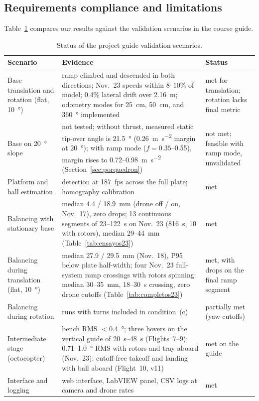\subsection{Requirements compliance and limitations}
\label{sec:requirements}
\label{sec:limits}
Table~\ref{tab:req} compares our results against the validation scenarios in the course guide.

\begin{table}[!htbp]
\centering
\caption{Status of the project guide validation scenarios.}
\label{tab:req}
\footnotesize
\renewcommand{\arraystretch}{1.1}
\begin{tabularx}{\textwidth}{@{}>{\raggedright\arraybackslash}p{}>{\raggedright\arraybackslash}X>{\raggedright\arraybackslash}p{}@{}}
\toprule
Scenario & Evidence & Status \\
\midrule
Base translation and rotation (flat, \SI{10}{\degree}) & ramp climbed and descended in both directions; Nov.~23 speeds within 8--10\% of model; 0.4\% lateral drift over \SI{2.16}{\metre}; odometry modes for \SI{25}{\centi\metre}, \SI{50}{\centi\metre}, and \SI{360}{\degree} implemented & met for translation; rotation lacks final metric \\
Base on \SI{20}{\degree} slope & not tested; without thrust, measured static tip-over angle is \SI{21.5}{\degree} (\SI{0.26}{\metre\per\second\squared} margin at \SI{20}{\degree}); with ramp mode ($f=0.35$--0.55), margin rises to 0.72--\SI{0.98}{\metre\per\second\squared} (Section~\ref{sec:porquedron}) & not met; feasible with ramp mode, unvalidated \\
Platform and ball estimation & detection at \SI{187}{fps} across the full plate; homography calibration & met \\
Balancing with stationary base & median 4.4 / \SI{18.9}{\milli\metre} (drone off / on, Nov.~17), zero drops; 13 continuous segments of 23--\SI{122}{\second} on Nov.~23 (\SI{816}{\second}, 10 with rotors), median 29--\SI{44}{\milli\metre} (Table~\ref{tab:ensayos23}) & met \\
Balancing during translation (flat, \SI{10}{\degree}) & median 27.9 / \SI{29.5}{\milli\metre} (Nov.~18), P95 below plate half-width; four Nov.~23 full-system ramp crossings with rotors spinning: median 30--\SI{35}{\milli\metre}, 18--\SI{30}{\second} crossing, zero drone cutoffs (Table~\ref{tab:completos23}) & met, with drops on the final ramp segment \\
Balancing during rotation & runs with turns included in condition~(c) & partially met (yaw cutoffs) \\
Intermediate stage (octocopter) & bench RMS $<$\SI{0.4}{\degree}; three hovers on the vertical guide of \SIrange{20}{48}{\second} (Flights~7--9); 0.71--\SI{1.0}{\degree} RMS with rotors and tray aboard (Nov.~23); cutoff-free takeoff and landing with ball aboard (Flight~10, v11) & met on the guide \\
Interface and logging & web interface, LabVIEW panel, CSV logs at camera and drone rates & met \\
\bottomrule
\end{tabularx}
\end{table}

